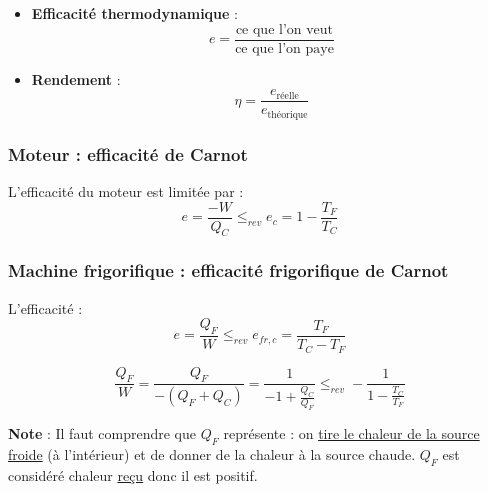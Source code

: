 \begin{itemize}

    \item \textbf{Efficacité thermodynamique} : 
      \begin{equation}
        e = \frac{\text{ce que l'on veut}}{\text{ce que l'on paye}} 
      \end{equation} 
    \item \textbf{Rendement} : 
      \begin{equation}
        \eta = \frac{e _{\text{réelle}}}{e _{\text{théorique}}} 
      \end{equation}

\end{itemize}

\subsubsection{Moteur : efficacité de Carnot} %
\label{sec:Moteur : efficacité de Carnot}

L'efficacité du moteur est limitée par : 
\begin{equation}
  e  = \frac{-W}{Q_C} \le _{rev} e_c = 1 - \frac{T_F}{T_C} 
\end{equation}

\subsubsection{Machine frigorifique : efficacité frigorifique de Carnot} %
\label{sec:Machine frigorifique}

L'efficacité : 
\begin{equation}
  e  = \frac{Q_F}{W}  \le _{rev} e _{fr,c} =  \frac{T_F}{T_C- T_F} 
\end{equation}

\begin{myproof}{}{}
\begin{equation}
  \frac{Q_F}{W}  = \frac{Q_F}{-(Q_F+Q_C)}  = \frac{1}{ - 1 + \frac{Q_C}{Q_F} }  \le _{rev} - \frac{1}{ 1- \frac{T_C}{T_F} } 
\end{equation}
\end{myproof}


\begin{tcolorbox}
    \textbf{Note} : Il faut comprendre que $Q_F$ représente : on \underline{tire le chaleur de la source froide} (à l'intérieur) et de donner de la chaleur à la source chaude. $Q_F$ est considéré chaleur \underline{reçu} donc il est positif.
\end{tcolorbox}


